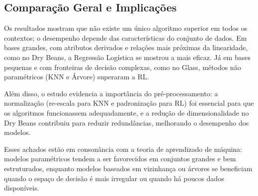 \documentclass[
  letterpaper,
  DIV=11,
  numbers=noendperiod]{scrartcl}
\begin{document}
\subsection{Comparação Geral e
Implicações}\label{comparauxe7uxe3o-geral-e-implicauxe7uxf5es}

Os resultados mostram que não existe um único algoritmo superior em
todos os contextos; o desempenho depende das características do conjunto
de dados. Em bases grandes, com atributos derivados e relações mais
próximas da linearidade, como no Dry Beans, a Regressão Logística se
mostrou a mais eficaz. Já em bases pequenas e com fronteiras de decisão
complexas, como no Glass, métodos não paramétricos (KNN e Árvore)
superaram a RL.

Além disso, o estudo evidencia a importância do pré-processamento: a
normalização (re-escala para KNN e padronização para RL) foi essencial
para que os algoritmos funcionassem adequadamente, e a redução de
dimensionalidade no Dry Beans contribuiu para reduzir redundâncias,
melhorando o desempenho dos modelos.

Esses achados estão em consonância com a teoria de aprendizado de
máquina: modelos paramétricos tendem a ser favorecidos em conjuntos
grandes e bem estruturados, enquanto modelos baseados em vizinhança ou
árvores se beneficiam quando o espaço de decisão é mais irregular ou
quando há poucos dados disponíveis.
\end{document}
